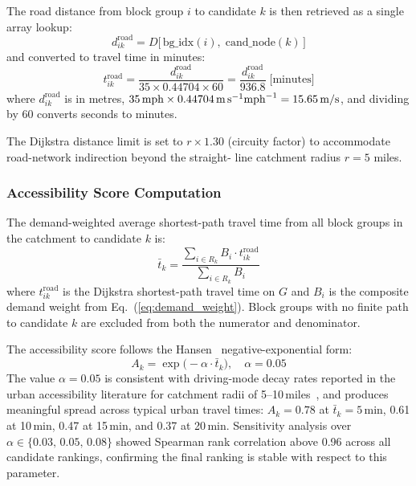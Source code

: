 \documentclass[conference]{IEEEtran}
\begin{document}
The road distance from block group $i$ to candidate $k$ is then
retrieved as a single array lookup:
\begin{equation}
d_{ik}^{\text{road}} = D\bigl[\,\text{bg\_idx}(i),\;
                                \text{cand\_node}(k)\,\bigr]
\label{eq:lookup}
\end{equation}
and converted to travel time in minutes:
\begin{equation}
t_{ik}^{\text{road}}
  = \frac{d_{ik}^{\text{road}}}{35 \times 0.44704 \times 60}
  = \frac{d_{ik}^{\text{road}}}{936.8}\;\text{[minutes]}
\label{eq:ttime}
\end{equation}
where $d_{ik}^{\text{road}}$ is in metres, $35\,\text{mph} \times
0.44704\,\text{m\,s}^{-1}\text{mph}^{-1} = 15.65\,\text{m/s}$, and
dividing by 60 converts seconds to minutes.

The Dijkstra distance limit is set to $r \times 1.30$ (circuity
factor) to accommodate road-network indirection beyond the straight-
line catchment radius $r = 5$ miles.

\subsubsection{Accessibility Score Computation}

The demand-weighted average shortest-path travel time from all block
groups in the catchment to candidate $k$ is:
\begin{equation}
\bar{t}_k = \frac{\sum_{i \in R_k} B_i \cdot t_{ik}^{\text{road}}}
                  {\sum_{i \in R_k} B_i}
\label{eq:tbar}
\end{equation}
where $t_{ik}^{\text{road}}$ is the Dijkstra shortest-path travel time
on $G$ and $B_i$ is the composite demand weight from
Eq.~(\ref{eq:demand_weight}).  Block groups with no finite path to
candidate $k$ are excluded from both the numerator and denominator.

The accessibility score follows the Hansen~\cite{Hansen1959}
negative-exponential form:
\begin{equation}
A_k = \exp\!\bigl(-\alpha \cdot \bar{t}_k\bigr), \quad \alpha = 0.05
\label{eq:access}
\end{equation}
The value $\alpha = 0.05$ is consistent with driving-mode decay rates
reported in the urban accessibility literature for catchment radii of
5--10\,miles~\cite{Luo2003, Wang2012}, and produces meaningful spread
across typical urban travel times: $A_k = 0.78$ at $\bar{t}_k =
5$\,min, 0.61 at 10\,min, 0.47 at 15\,min, and 0.37 at 20\,min.
Sensitivity analysis over $\alpha \in \{0.03,\,0.05,\,0.08\}$
showed Spearman rank correlation above 0.96 across all candidate
rankings, confirming the final ranking is stable with respect to
this parameter.
\end{document}
